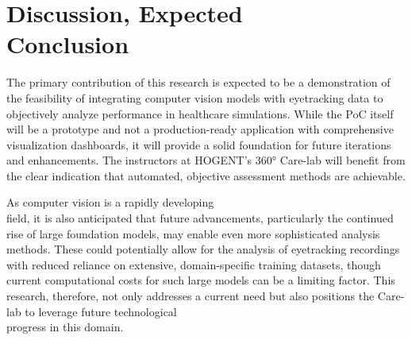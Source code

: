 \documentclass[english]{hogent-article}
\begin{document}
\section{Discussion, Expected\\ Conclusion}
\label{sec:discussion-conclusion}

The primary contribution of this research is expected to be a demonstration of the feasibility of integrating computer vision models with eyetracking data to objectively analyze performance in healthcare simulations.
While the PoC itself will be a prototype and not a production-ready application with comprehensive visualization dashboards, it will provide a solid foundation for future iterations and enhancements.
The instructors at HOGENT's 360° Care-lab will benefit from the clear indication that automated, objective assessment methods are achievable.

As computer vision is a rapidly developing\\ field, it is also anticipated that future advancements, particularly the continued rise of large foundation models, may enable even more sophisticated analysis methods. 
These could potentially allow for the analysis of eyetracking recordings with reduced reliance on extensive, domain-specific training datasets, though current computational costs for such large models can be a limiting factor. 
This research, therefore, not only addresses a current need but also positions the Care-lab to leverage future technological\\ progress in this domain.

\begingroup
\setlength{\emergencystretch}{3em}
\printbibliography[heading=bibintoc]
\endgroup
\end{document}

